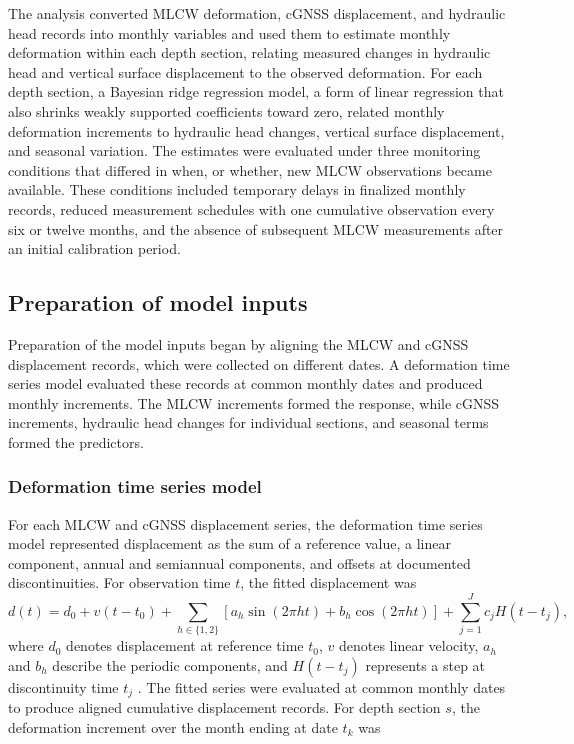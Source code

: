 The analysis converted MLCW deformation, cGNSS displacement, and hydraulic head records into monthly variables and used them to estimate monthly deformation within each depth section, relating measured changes in hydraulic head and vertical surface displacement to the observed deformation. For each depth section, a Bayesian ridge regression model, a form of linear regression that also shrinks weakly supported coefficients toward zero, related monthly deformation increments to hydraulic head changes, vertical surface displacement, and seasonal variation. The estimates were evaluated under three monitoring conditions that differed in when, or whether, new MLCW observations became available. These conditions included temporary delays in finalized monthly records, reduced measurement schedules with one cumulative observation every six or twelve months, and the absence of subsequent MLCW measurements after an initial calibration period.

\subsection{Preparation of model inputs}
\label{subsec:predictor_preparation}

Preparation of the model inputs began by aligning the MLCW and cGNSS displacement records, which were collected on different dates. A deformation time series model evaluated these records at common monthly dates and produced monthly increments. The MLCW increments formed the response, while cGNSS increments, hydraulic head changes for individual sections, and seasonal terms formed the predictors.

\subsubsection{Deformation time series model}
\label{subsec:deformation_model}

For each MLCW and cGNSS displacement series, the deformation time series model represented displacement as the sum of a reference value, a linear component, annual and semiannual components, and offsets at documented discontinuities. For observation time $t$, the fitted displacement was
\begin{equation}
d(t)=d_0+v(t-t_0)
+\sum_{h\in\{1,2\}}
\left[a_h\sin(2\pi h t)+b_h\cos(2\pi h t)\right]
+\sum_{j=1}^{J}c_j H(t-t_j),
\label{eq:deformation_model}
\end{equation}
\noindent where $d_0$ denotes displacement at reference time $t_0$, $v$ denotes linear velocity, $a_h$ and $b_h$ describe the periodic components, and $H(t-t_j)$ represents a step at discontinuity time $t_j$ \citep{nikolaidis_observation_2002, bevis_2014}. The fitted series were evaluated at common monthly dates to produce aligned cumulative displacement records. For depth section $s$, the deformation increment over the month ending at date $t_k$ was

